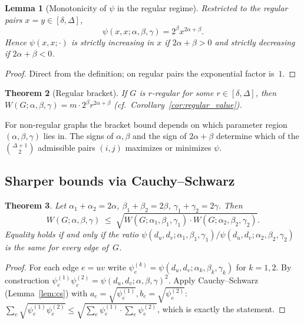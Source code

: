 \documentclass[11pt,a4paper]{article}
\newtheorem{theorem}{Theorem}[section]
\newtheorem{lemma}[theorem]{Lemma}
\theoremstyle{definition}
\newcommand{\Wuzi}{W(G;\alpha,\beta,\gamma)}
\begin{document}
\begin{lemma}[Monotonicity of $\psi$ in the regular regime]
\label{lem:psi_mono_regular}
Restricted to the regular pairs $x=y\in[\delta,\Delta]$,
\[\psi(x,x;\alpha,\beta,\gamma)=2^{\beta} x^{2\alpha+\beta}.\]
Hence $\psi(x,x;\cdot)$ is strictly increasing in $x$ if
$2\alpha+\beta>0$ and strictly decreasing if $2\alpha+\beta<0$.
\end{lemma}

\begin{proof}
Direct from the definition; on regular pairs the exponential
factor is~$1$.
\end{proof}

\begin{theorem}[Regular bracket]\label{thm:regular_bracket}
If $G$ is $r$-regular for some $r\in[\delta,\Delta]$, then
$\Wuzi = m\cdot 2^{\beta} r^{2\alpha+\beta}$ (cf.\
Corollary~\ref{cor:regular_value}).
\end{theorem}

For non-regular graphs the bracket bound depends on which
parameter region $(\alpha,\beta,\gamma)$ lies in. The signs of
$\alpha,\beta$ and the sign of $2\alpha+\beta$ determine which of
the $\binom{\Delta+1}{2}$ admissible pairs $(i,j)$ maximizes or
minimizes $\psi$.

\subsection{Sharper bounds via Cauchy--Schwarz}

\begin{theorem}\label{thm:cs}
Let $\alpha_1+\alpha_2=2\alpha$, $\beta_1+\beta_2=2\beta$,
$\gamma_1+\gamma_2=2\gamma$. Then
\[
W(G;\alpha,\beta,\gamma)\;\le\;
\sqrt{W(G;\alpha_1,\beta_1,\gamma_1)\cdot W(G;\alpha_2,\beta_2,\gamma_2)}.
\]
Equality holds if and only if the ratio
$\psi(d_u,d_v;\alpha_1,\beta_1,\gamma_1)/\psi(d_u,d_v;\alpha_2,\beta_2,\gamma_2)$
is the same for every edge of~$G$.
\end{theorem}

\begin{proof}
For each edge $e=uv$ write
$\psi_e^{(k)}=\psi(d_u,d_v;\alpha_k,\beta_k,\gamma_k)$ for $k=1,2$.
By construction
$\psi_e^{(1)}\psi_e^{(2)}=\psi(d_u,d_v;\alpha,\beta,\gamma)^{2}$.
Apply Cauchy--Schwarz (Lemma~\ref{lem:cs}) with
$a_e=\sqrt{\psi_e^{(1)}}, b_e=\sqrt{\psi_e^{(2)}}$:
$\sum_e \sqrt{\psi_e^{(1)}\psi_e^{(2)}}\le
\sqrt{\sum_e \psi_e^{(1)}\cdot \sum_e \psi_e^{(2)}}$,
which is exactly the statement.
\end{proof}
\end{document}
